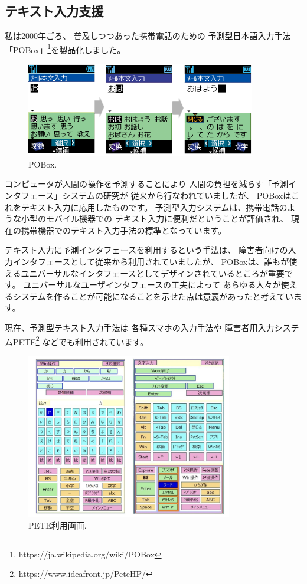 \documentclass[topics]{compsoft} %
\begin{document}
\subsection{テキスト入力支援}

私は2000年ごろ、
普及しつつあった携帯電話のための
予測型日本語入力手法「POBox」\footnote{
  \textsf{https:{\slash}{\slash}ja.wikipedia.org{\slash}wiki{\slash}POBox}
}を製品化しました。

\begin{figure}[h]
  \includegraphics[width=10cm,bb=0 0 404 600]{figures/ac2b347a7042f920edd576ee07c4b7f4.png}
  \caption{POBox.}
  \label{example1}
\end{figure}

コンピュータが人間の操作を予測することにより
人間の負担を減らす「予測インタフェース」システムの研究が
従来から行なわれていましたが\cite{WatchWhatIDo}\cite{YourWish}、
POBoxはこれをテキスト入力に応用したものです。
%
予測型入力システムは、携帯電話のような小型のモバイル機器での
テキスト入力に便利だということが評価され、
現在の携帯機器でのテキスト入力手法の標準となっています。

テキスト入力に予測インタフェースを利用するという手法は、
障害者向けの入力インタフェースとして従来から利用されていましたが、
POBoxは、誰もが使えるユニバーサルなインタフェースとしてデザインされているところが重要です。
ユニバーサルなユーザインタフェースの工夫によって
あらゆる人々が使えるシステムを作ることが可能になることを示せた点は意義があったと考えています。

現在、予測型テキスト入力手法は
各種スマホの入力手法や
障害者用入力システムPETE\footnote{
  \textsf{https:{\slash}{\slash}www.ideafront.jp{\slash}PeteHP{\slash}}
}
などでも利用されています。

\begin{figure}[h]
  \includegraphics[width=9cm,bb=0 0 1456 1172]{figures/a2f652e2f488b96974e92f8198f49469.jpg}
  \caption{PETE利用画面.}
  \label{pete}
\end{figure}
\end{document}
